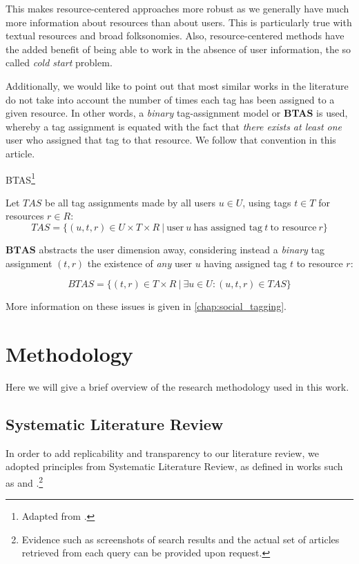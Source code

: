 This makes resource-centered approaches more robust as we generally have much more information about resources than about users. This is particularly true with textual resources and broad folksonomies. Also, resource-centered methods have the added benefit of being able to work in the absence of user information, the so called \textit{cold start} problem.

Additionally, we would like to point out that most similar works in the literature do not take into account the number of times each tag has been assigned to a given resource. In other words, a \textit{binary} tag-assignment model or \textbf{BTAS} \citep{illig_etal_2011} is used, whereby a tag assignment is equated with the fact that \textit{there exists at least one} user who assigned that tag to that resource. We follow that convention in this article.

\begin{definition}{BTAS}\footnote{Adapted from \cite{illig_etal_2011}.}

Let $TAS$ be all tag assignments made by all users $u \in U$, using tags $t \in T$ for resources $r \in R$:
\[ TAS = \{ (u,t,r) \in  U \times T \times R \ | \ \text{user} \ u \ \text{has assigned tag} \ t \ \text{to resource} \ r \} \]  

$\mathbf{BTAS}$ abstracts the user dimension away, considering instead a \textit{binary} tag assignment $(t,r)$ the existence of \textit{any} user $u$ having assigned tag $t$ to resource $r$:

\[ BTAS = \{(t,r) \in T \times R \ | \ \exists u \in U : (u,t,r) \in TAS \}  \]

\end{definition}

More information on these issues is given in \autoref{chap:social_tagging}.

\section{Methodology}\label{section:intro_methodology}

Here we will give a brief overview of the research methodology used in this work.

\subsection{Systematic Literature Review}\label{section:literature_review}

In order to add replicability and transparency to our literature review, we adopted principles from Systematic Literature Review, as defined in works such as \cite{baumeister_leary_1997} and \cite{bem_1995}.\footnote{Evidence such as screenshots of search results and the actual set of articles retrieved from each query can be provided upon request.}

